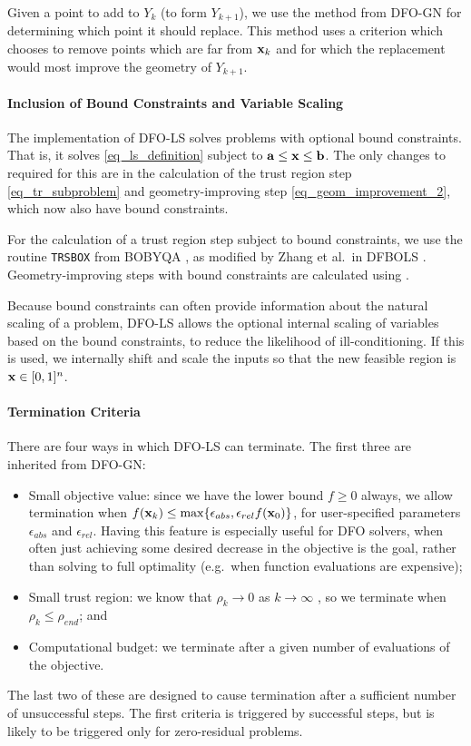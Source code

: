 Given a point to add to $Y_k$ (to form $Y_{k+1}$), we use the method from DFO-GN for determining which point it should replace.
This method uses a criterion which chooses to remove points which are far from $\mathbf{x}_k$ and for which the replacement would most improve the geometry of $Y_{k+1}$.

\paragraph{Inclusion of Bound Constraints and Variable Scaling}
The implementation of DFO-LS solves problems with optional bound constraints.
That is, it solves \eqref{eq_ls_definition} subject to $\mathbf{a} \leq \mathbf{x} \leq \mathbf{b}$.
The only changes to  required for this are in the calculation of the trust region step \eqref{eq_tr_subproblem} and geometry-improving step \eqref{eq_geom_improvement_2}, which now also have bound constraints.

For the calculation of a trust region step subject to bound constraints, we use the routine \texttt{TRSBOX} from BOBYQA \cite{Powell2009}, as modified by Zhang et al.~in DFBOLS \cite{Zhang2010}.
Geometry-improving steps with bound constraints are calculated using \cite[Algorithm 3]{Cartis2017a}.

Because bound constraints can often provide information about the natural scaling of a problem, DFO-LS allows the optional internal scaling of variables based on the bound constraints, to reduce the likelihood of ill-conditioning.
If this is used, we internally shift and scale the inputs so that the new feasible region is $\mathbf{x}\in[0,1]^n$.

\paragraph{Termination Criteria}
There are four ways in which DFO-LS can terminate.
The first three are inherited from DFO-GN:
\begin{itemize}
	\item Small objective value: since we have the lower bound $f\geq 0$ always, we allow termination when $f(\mathbf{x}_k) \leq \max\{\epsilon_{abs}, \epsilon_{rel}f(\mathbf{x}_0)\}$, for user-specified parameters $\epsilon_{abs}$ and $\epsilon_{rel}$.
	Having this feature is especially useful for DFO solvers, when often just achieving some desired decrease in the objective is the goal, rather than solving to full optimality (e.g.~when function evaluations are expensive);
	\item Small trust region: we know that $\rho_k\to 0$ as $k\to\infty$ \cite[Lemma 3.11]{Cartis2017a}, so we terminate when $\rho_k \leq \rho_{end}$; and
	\item Computational budget: we terminate after a given number of evaluations of the objective.
\end{itemize}
The last two of these are designed to cause termination after a sufficient number of unsuccessful steps.
The first criteria is triggered by successful steps, but is likely to be triggered only for zero-residual problems.

